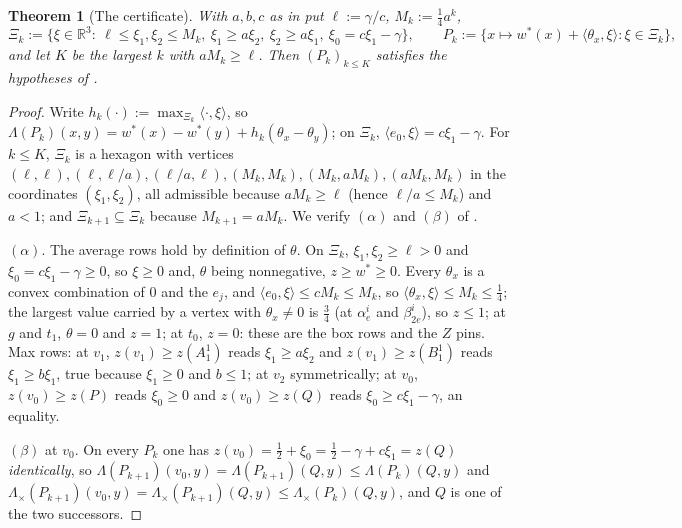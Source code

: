 \documentclass[11pt]{article}
\theoremstyle{plain}
\newtheorem{theorem}{Theorem}[section]
\theoremstyle{definition}
\begin{document}
\begin{theorem}[The certificate]\label{thm:bc-cert}
With $a,b,c$ as in  put $\ell:=\gamma/c$,
$M_k:=\tfrac14a^{k}$,
\[
  \Xi_k:=\bigl\{\xi\in\mathbb R^{3}:\ \ell\le\xi_1,\xi_2\le M_k,\
  \xi_1\ge a\xi_2,\ \xi_2\ge a\xi_1,\ \xi_0=c\xi_1-\gamma\bigr\},\qquad
  P_k:=\{x\mapsto w^\ast(x)+\langle\theta_x,\xi\rangle:\xi\in\Xi_k\},
\]
and let $K$ be the largest $k$ with $aM_k\ge\ell$. Then $(P_k)_{k\le K}$
satisfies the hypotheses of \Cref{thm:convex-barrier-both}.
\end{theorem}

\begin{proof}
Write $h_k(\cdot):=\max_{\Xi_k}\langle\cdot,\xi\rangle$, so
$\Lambda(P_k)(x,y)=w^\ast(x)-w^\ast(y)+h_k(\theta_x-\theta_y)$; on $\Xi_k$,
$\langle e_0,\xi\rangle=c\xi_1-\gamma$. For $k\le K$, $\Xi_k$ is a
hexagon with vertices
$(\ell,\ell),(\ell,\ell/a),(\ell/a,\ell),(M_k,M_k),(M_k,aM_k),(aM_k,M_k)$
in the coordinates $(\xi_1,\xi_2)$, all admissible because $aM_k\ge\ell$
(hence $\ell/a\le M_k$) and $a<1$; and $\Xi_{k+1}\subseteq\Xi_k$ because
$M_{k+1}=aM_k$. We verify $(\alpha)$ and $(\beta)$ of
.

$(\alpha)$. The average rows hold by definition of $\theta$. On $\Xi_k$,
$\xi_1,\xi_2\ge\ell>0$ and $\xi_0=c\xi_1-\gamma\ge0$, so $\xi\ge0$ and,
$\theta$ being nonnegative, $z\ge w^\ast\ge0$. Every $\theta_x$ is a
convex combination of $0$ and the $e_j$, and
$\langle e_0,\xi\rangle\le cM_k\le M_k$, so
$\langle\theta_x,\xi\rangle\le M_k\le\tfrac14$; the largest value carried
by a vertex with $\theta_x\ne0$ is $\tfrac34$ (at $\alpha^{i}_e$ and
$\beta^{i}_{2e}$), so $z\le1$; at $g$ and $t_1$, $\theta=0$ and $z=1$; at
$t_0$, $z=0$: these are the box rows and the $Z$ pins. Max rows: at
$v_1$, $z(v_1)\ge z(A^{1}_1)$ reads $\xi_1\ge a\xi_2$ and
$z(v_1)\ge z(B^{1}_1)$ reads $\xi_1\ge b\xi_1$, true because $\xi_1\ge0$
and $b\le1$; at $v_2$ symmetrically; at $v_0$, $z(v_0)\ge z(P)$ reads
$\xi_0\ge0$ and $z(v_0)\ge z(Q)$ reads $\xi_0\ge c\xi_1-\gamma$, an
equality.

$(\beta)$ at $v_0$. On every $P_k$ one has
$z(v_0)=\tfrac12+\xi_0=\tfrac12-\gamma+c\xi_1=z(Q)$ \emph{identically},
so $\Lambda(P_{k+1})(v_0,y)=\Lambda(P_{k+1})(Q,y)\le\Lambda(P_k)(Q,y)$
and $\Lambda_\times(P_{k+1})(v_0,y)=\Lambda_\times(P_{k+1})(Q,y)
\le\Lambda_\times(P_k)(Q,y)$, and $Q$ is one of the two successors.


\end{proof}
\end{document}
